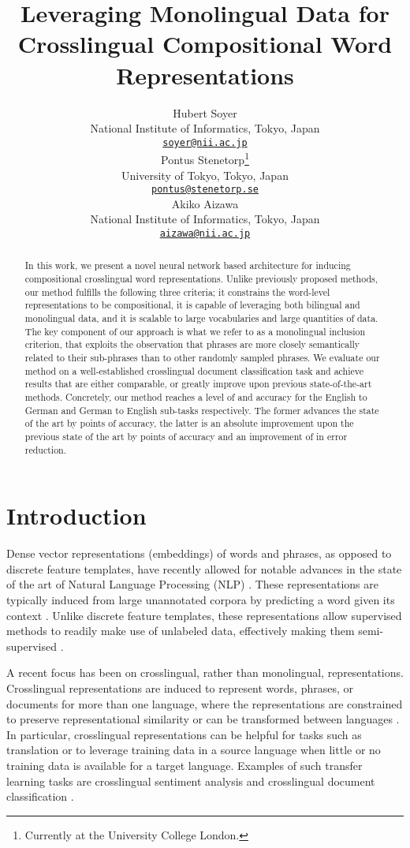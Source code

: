 \documentclass{article} \usepackage{iclr2015,times}
\title{
    Leveraging Monolingual Data
        for Crosslingual Compositional Word Representations
}
\author{
    Hubert Soyer \\
    National Institute of Informatics, Tokyo, Japan \\
    {\tt \href{mailto:soyer@nii.ac.jp}{soyer@nii.ac.jp}} \\
    \And
    Pontus Stenetorp\thanks{
        Currently at the University College London.
    } \\
    University of Tokyo, Tokyo, Japan \\
    {\tt \href{mailto:pontus@stenetorp.se}{pontus@stenetorp.se}} \\
    \And
    Akiko Aizawa \\
    National Institute of Informatics, Tokyo, Japan \\
    {\tt \href{mailto:aizawa@nii.ac.jp}{aizawa@nii.ac.jp}}
}
\begin{document}
\maketitle

\begin{abstract}
In this work, we present a novel neural network based architecture for
inducing compositional crosslingual word representations.
Unlike previously proposed methods, our method fulfills the following three
criteria; it constrains the word-level representations to be compositional,
it is capable of leveraging both bilingual and monolingual data, and it is
scalable to large vocabularies and large quantities of data.
The key component of our approach is what we refer to as a monolingual inclusion
criterion, that exploits the observation that phrases are more closely
semantically related to their sub-phrases than to other randomly sampled
phrases.
We evaluate our method on a well-established crosslingual document
classification task and achieve results that are either comparable, or greatly
improve upon previous state-of-the-art methods.
Concretely, our method reaches a level of  and  accuracy for
the English to German and German to English sub-tasks respectively.
The former advances the state of the art by  points of accuracy,
the latter is an absolute improvement upon the previous state of the art
by  points of accuracy and an improvement of  in error reduction.
\end{abstract}

\section{Introduction}

Dense vector representations (embeddings) of words and phrases, as opposed to
discrete feature templates, have recently allowed for notable advances in the
state of the art of Natural Language Processing (NLP)
\citep{socher2013recursive,baroni2014dont}.
These representations are typically induced from large unannotated corpora by
predicting a word given its context \citep{collobert2008unified}.
Unlike discrete feature templates, these representations allow supervised
methods to readily make use of unlabeled data, effectively making
them semi-supervised \citep{turian2010word}.

A recent focus has been on crosslingual, rather than monolingual,
representations.
Crosslingual representations are induced to represent words, phrases,
or documents for more than one language, where the representations are
constrained to preserve representational similarity or can be transformed
between languages
\citep{klementiev2012inducing,mikolov2013mt,hermann2014multilingual}.
In particular, crosslingual representations can be helpful for tasks such as
translation or to leverage training data in a source language when little
or no training data is available for a target language.
Examples of such transfer learning tasks are crosslingual sentiment
analysis \citep{wan2009crosssentiment}
and crosslingual document classification \citep{klementiev2012inducing}.
\end{document}
